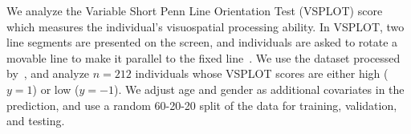 \documentclass[11pt]{article}
\theoremstyle{plain}
\theoremstyle{definition}
\begin{document}
We analyze the Variable Short Penn Line Orientation Test (VSPLOT) score which measures the individual's visuospatial processing ability. In VSPLOT, two line segments are presented on the screen, and individuals are asked to rotate a movable line to make it parallel to the fixed line~\citep{moore2015development}. We use the dataset processed by~\cite{wang2019common}, and analyze $n=212$ individuals whose VSPLOT scores are either high ($y=1$) or low ($y=-1$). We adjust age and gender as additional covariates in the prediction, and use a random 60-20-20 split of the data for training, validation, and testing. 

\end{document}
